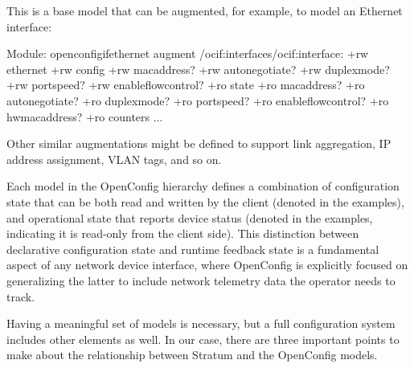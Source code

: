 \documentclass[letterpaper,11pt,english]{sphinxmanual}
\begin{document}
This is a base model that can be augmented, for example, to model an Ethernet interface:

\begin{sphinxVerbatim}[commandchars=\\\{\}]
Module: openconfig\PYGZhy{}if\PYGZhy{}ethernet
        augment /ocif:interfaces/ocif:interface:
                +\PYGZhy{}\PYGZhy{}rw ethernet
                +\PYGZhy{}\PYGZhy{}rw config
                 \textbar{}      +\PYGZhy{}\PYGZhy{}rw mac\PYGZhy{}address?
                 \textbar{}      +\PYGZhy{}\PYGZhy{}rw auto\PYGZhy{}negotiate?
                 \textbar{}      +\PYGZhy{}\PYGZhy{}rw duplex\PYGZhy{}mode?
                 \textbar{}      +\PYGZhy{}\PYGZhy{}rw port\PYGZhy{}speed?
                 \textbar{}      +\PYGZhy{}\PYGZhy{}rw enable\PYGZhy{}flow\PYGZhy{}control?
                +\PYGZhy{}\PYGZhy{}ro state
                        +\PYGZhy{}\PYGZhy{}ro mac\PYGZhy{}address?
                        +\PYGZhy{}\PYGZhy{}ro auto\PYGZhy{}negotiate?
                        +\PYGZhy{}\PYGZhy{}ro duplex\PYGZhy{}mode?
                        +\PYGZhy{}\PYGZhy{}ro port\PYGZhy{}speed?
                        +\PYGZhy{}\PYGZhy{}ro enable\PYGZhy{}flow\PYGZhy{}control?
                        +\PYGZhy{}\PYGZhy{}ro hw\PYGZhy{}mac\PYGZhy{}address?
                        +\PYGZhy{}\PYGZhy{}ro counters
                               ...
\end{sphinxVerbatim}

Other similar augmentations might be defined to support link
aggregation, IP address assignment, VLAN tags, and so on.

Each model in the OpenConfig hierarchy defines a combination of
configuration state that can be both read and written by the client
(denoted  in the examples), and operational state that reports
device status (denoted  in the examples, indicating it is
read-only from the client side). This distinction between declarative
configuration state and runtime feedback state is a fundamental aspect
of any network device interface, where OpenConfig is explicitly
focused on generalizing the latter to include network telemetry data
the operator needs to track.

Having a meaningful set of models is necessary, but a full
configuration system includes other elements as well. In our case,
there are three important points to make about the relationship
between Stratum and the OpenConfig models.
\end{document}
